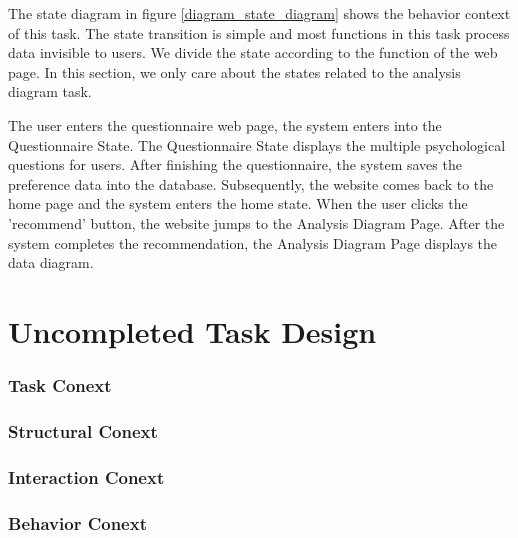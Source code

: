 \documentclass[conference]{IEEEtran}
\begin{document}
\textbf{}

The state diagram in figure \ref{diagram_state_diagram} shows the behavior context of this task. The state transition is simple and most functions in this task process data invisible to users. We divide the state according to the function of the web page. In this section, we only care about the states related to the analysis diagram task.

The user enters the questionnaire web page, the system enters into the Questionnaire State. The Questionnaire State displays the multiple psychological questions for users. After finishing the questionnaire, the system saves the preference data into the database. Subsequently, the website comes back to the home page and the system enters the home state. When the user clicks the 'recommend' button, the website jumps to the Analysis Diagram Page. After the system completes the recommendation, the Analysis Diagram Page displays the data diagram. 



\section{\textbf{Uncompleted Task Design }}


\subsubsection{\textbf{Task Conext }}


\subsubsection{\textbf{Structural Conext }}


\subsubsection{\textbf{Interaction Conext }}


\subsubsection{\textbf{Behavior Conext }}
\end{document}
